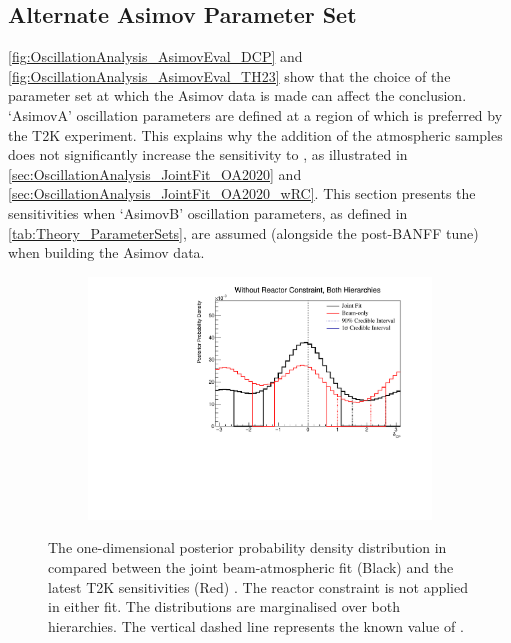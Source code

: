 \clearpage
\subsection{Alternate Asimov Parameter Set}
\label{sec:OscillationAnalysis_AsimovB}

\autoref{fig:OscillationAnalysis_AsimovEval_DCP} and \autoref{fig:OscillationAnalysis_AsimovEval_TH23} show that the choice of the parameter set at which the Asimov data is made can affect the conclusion. `AsimovA' oscillation parameters are defined at a region of  which is preferred by the T2K experiment. This explains why the addition of the atmospheric samples does not significantly increase the sensitivity to , as illustrated in \autoref{sec:OscillationAnalysis_JointFit_OA2020} and \autoref{sec:OscillationAnalysis_JointFit_OA2020_wRC}. This section presents the sensitivities when `AsimovB' oscillation parameters, as defined in \autoref{tab:Theory_ParameterSets}, are assumed (alongside the post-BANFF tune) when building the Asimov data.

\begin{figure}[h]
  \begin{subfigure}[t]{0.98\textwidth}
    \includegraphics[width=\textwidth, trim={0mm 0mm 0mm 0mm}, clip,page=1]{Figures/OA/JointFit_OA2020_Comp_AsimovB/ContourComparison_1D_dcp_BH_2_woRC_UnSmeared_CredibleInterval.pdf}
  \end{subfigure}
  \caption{The one-dimensional posterior probability density distribution in  compared between the joint beam-atmospheric fit (Black) and the latest T2K sensitivities (Red) \cite{Dunne2020-uf, t2k_tn_393}. The reactor constraint is not applied in either fit. The distributions are marginalised over both hierarchies. The vertical dashed line represents the known value of .}
  \label{fig:OscillationAnalysis_JointFit_AsimovB_DCP}
\end{figure}

